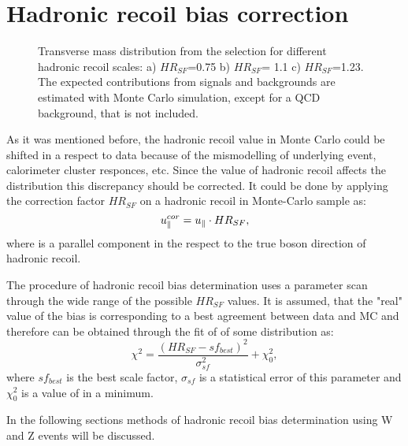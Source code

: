\section{Hadronic recoil bias correction}

\begin{figure}[!b]
\endminipage\hfill
{}
\endminipage\hfill
{}%
\endminipage
\caption{Transverse mass distribution from the \wenu selection for different hadronic recoil scales: a) $HR_{SF}$=0.75 b) $HR_{SF}$= 1.1 c) $HR_{SF}$=1.23. The expected contributions from signals and backgrounds are estimated with Monte Carlo simulation, except for a QCD background, that is not included.}
\label{HadronRecoilScaleMtW}
\end{figure}
As it was mentioned before, the hadronic recoil value in Monte Carlo could be shifted in a respect to data because of the mismodelling of underlying event, calorimeter cluster responces, etc. Since the value of hadronic recoil affects the \etmiss distribution this discrepancy should be corrected. It could be done by applying the correction factor $HR_{SF}$ on a hadronic recoil in Monte-Carlo sample as:
\begin{equation}
u_{\parallel}^{cor}=u_{\parallel} \cdot HR_{SF},
\end{equation}
where \upar is a parallel component in the respect to the true boson direction of hadronic recoil.

The procedure of hadronic recoil bias determination uses a parameter scan through the wide range of the possible $HR_{SF}$ values. It is assumed, that the "real" value of the bias is corresponding to a best agreement between data and MC and therefore can be obtained through the fit of \chiD of some distribution as:
\begin{equation}\label{eq:chiD}
\chi^2 = \frac{(HR_{SF}-sf_{best})^2}{\sigma_{sf}^2}+\chi^2_0,
\end{equation}
where $sf_{best}$ is the best scale factor,  $\sigma_{sf}$ is a statistical error of this parameter and $\chi^2_0$ is a value of \chiD in a minimum. 

In the following sections methods of hadronic recoil bias determination using W and Z events will be discussed.

